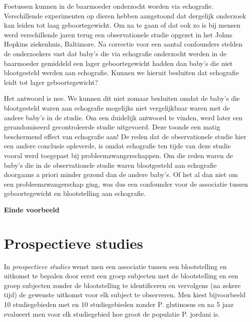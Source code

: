 \documentclass[
  12pt,dutch,coursenotes]{book}
\theoremstyle{definition}
\theoremstyle{definition}
\theoremstyle{definition}
\theoremstyle{remark}
\begin{document}
Foetussen kunnen in de baarmoeder onderzocht worden via
echografie. Verschillende experimenten op dieren hebben aangetoond dat
dergelijk onderzoek kan leiden tot laag geboortegewicht. Om na te gaan of
dat ook zo is bij mensen werd verschillende jaren terug een observationele
studie opgezet in het Johns Hopkins ziekenhuis, Baltimore. Na correctie voor
een aantal confounders stelden de onderzoekers vast dat baby's die via
echografie onderzocht werden in de baarmoeder gemiddeld een lager
geboortegewicht hadden dan baby's die niet blootgesteld werden aan
echografie. Kunnen we hieruit besluiten dat echografie leidt tot lager
geboortegewicht?

Het antwoord is nee. We kunnen dit niet zomaar besluiten omdat de baby's die blootgesteld waren aan echografie mogelijks niet vergelijkbaar waren met de andere baby's in de studie. Om een duidelijk antwoord te vinden, werd later een gerandomiseerd
gecontroleerde studie uitgevoerd. Deze toonde een matig beschermend effect
van echografie aan! De reden dat de observationele studie hier een andere
conclusie opleverde, is omdat echografie ten tijde van deze studie vooral
werd toegepast bij probleemzwangerschappen. Om die reden waren de baby's die
in de observationele studie waren blootgesteld aan echografie doorgaans a
priori minder gezond dan de andere baby's. Of het al dan niet om een
probleemzwangerschap ging, was dus een confounder voor de associatie tussen
geboortegewicht en blootstelling aan echografie.

\textbf{Einde voorbeeld}

\hypertarget{subsec:design:prosp}{%
\section{Prospectieve studies}\label{subsec:design:prosp}}

In \emph{prospectieve studies} wenst men een associatie tussen een
blootstelling en uitkomst te bepalen door eerst een groep subjecten met de
blootstelling en een groep subjecten zonder de blootstelling te
identificeren en vervolgens (na zekere tijd) de gewenste uitkomst voor elk subject
te observeren. Men kiest bijvoorbeeld 10 studiegebieden met en 10 studiegebieden zonder P. glutinosus en na 5 jaar evalueert men voor elk studiegebied hoe groot de populatie P. jordani is.
\end{document}
